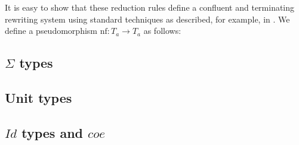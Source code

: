 \documentclass[reqno]{amsart}
\theoremstyle{definition}
\theoremstyle{remark}
\newcommand{\nf}{\mathrm{nf}}
\numberwithin{figure}{section}
\begin{document}
It is easy to show that these reduction rules define a confluent and terminating rewriting system using standard techniques as described, for example, in \cite{Terese}.
We define a pseudomorphism $\nf : T_a \to T_a$ as follows:

\subsection{$\Sigma$ types}

\subsection{Unit types}

\subsection{$Id$ types and $coe$}



\end{document}

